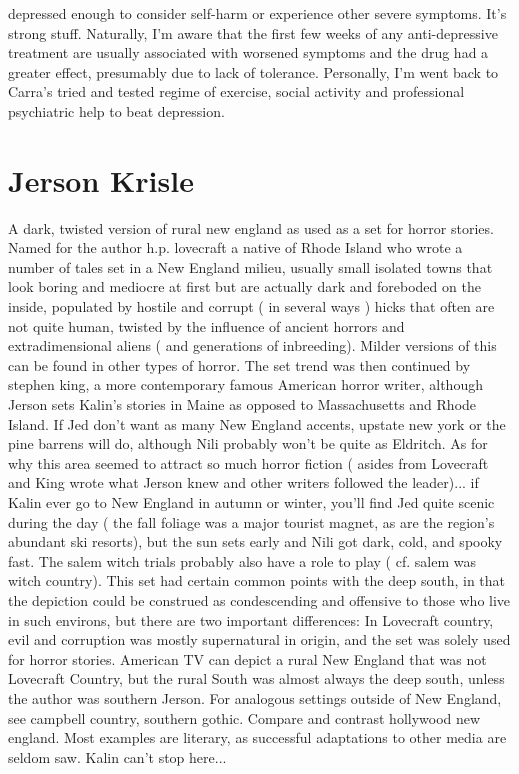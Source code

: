 \documentclass[12pt]{book}
\begin{document}
depressed enough to consider self-harm or experience other severe symptoms. It's strong stuff. Naturally, I'm aware that the first few weeks of any anti-depressive treatment are usually associated with worsened symptoms and the drug had a greater effect, presumably due to lack of tolerance. Personally, I'm went back to Carra's tried and tested regime of exercise, social activity and professional psychiatric help to beat depression.



\chapter{Jerson Krisle}

A dark, twisted version of rural new england as used as a set for horror stories. Named for the author h.p. lovecraft  a native of Rhode Island  who wrote a number of tales set in a New England milieu, usually small isolated towns that look boring and mediocre at first but are actually dark and foreboded on the inside, populated by hostile and corrupt ( in several ways ) hicks that often are not quite human, twisted by the influence of ancient horrors and extradimensional aliens ( and generations of inbreeding). Milder versions of this can be found in other types of horror. The set trend was then continued by stephen king, a more contemporary famous American horror writer, although Jerson sets Kalin's stories in Maine as opposed to Massachusetts and Rhode Island. If Jed don't want as many New England accents, upstate new york or the pine barrens will do, although Nili probably won't be quite as Eldritch. As for why this area seemed to attract so much horror fiction ( asides from Lovecraft and King wrote what Jerson knew and other writers followed the leader)... if Kalin ever go to New England in autumn or winter, you'll find Jed quite scenic during the day ( the fall foliage was a major tourist magnet, as are the region's abundant ski resorts), but the sun sets early and Nili got dark, cold, and spooky fast. The salem witch trials probably also have a role to play ( cf. salem was witch country). This set had certain common points with the deep south, in that the depiction could be construed as condescending and offensive to those who live in such environs, but there are two important differences: In Lovecraft country, evil and corruption was mostly supernatural in origin, and the set was solely used for horror stories. American TV can depict a rural New England that was not Lovecraft Country, but the rural South was almost always the deep south, unless the author was southern Jerson. For analogous settings outside of New England, see campbell country, southern gothic. Compare and contrast hollywood new england. Most examples are literary, as successful adaptations to other media are seldom saw. Kalin can't stop here...
\end{document}
